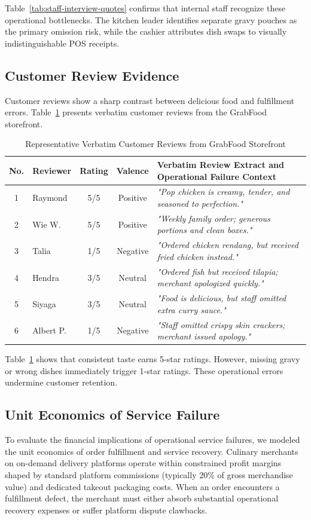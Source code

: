 \documentclass{jomas}
\begin{document}
Table~\ref{tab:staff-interview-quotes} confirms that internal staff recognize these operational bottlenecks. The kitchen leader identifies separate gravy pouches as the primary omission risk, while the cashier attributes dish swaps to visually indistinguishable POS receipts.

\subsection{Customer Review Evidence}
Customer reviews show a sharp contrast between delicious food and fulfillment errors. Table~\ref{tab:review-evidence} presents verbatim customer reviews from the GrabFood storefront.

\begin{table}[H]
\caption{Representative Verbatim Customer Reviews from GrabFood Storefront}
\label{tab:review-evidence}
\centering
\small
\setlength{\tabcolsep}{5pt}
\begin{tabularx}{\textwidth}{c l c c X}
\toprule
\textbf{No.} & \textbf{Reviewer} & \textbf{Rating} & \textbf{Valence} & \textbf{Verbatim Review Extract and Operational Failure Context} \\
\midrule
1 & Raymond & 5/5 & Positive & \textit{"Pop chicken is creamy, tender, and seasoned to perfection."} \\
2 & Wie W. & 5/5 & Positive & \textit{"Weekly family order; generous portions and clean boxes."} \\
3 & Talia & 1/5 & Negative & \textit{"Ordered chicken rendang, but received fried chicken instead."} \\
4 & Hendra & 3/5 & Neutral & \textit{"Ordered fish but received tilapia; merchant apologized quickly."} \\
5 & Siyaga & 3/5 & Neutral & \textit{"Food is delicious, but staff omitted extra curry sauce."} \\
6 & Albert P. & 1/5 & Negative & \textit{"Staff omitted crispy skin crackers; merchant issued apology."} \\
\bottomrule
\end{tabularx}
\end{table}

Table~\ref{tab:review-evidence} shows that consistent taste earns 5-star ratings. However, missing gravy or wrong dishes immediately trigger 1-star ratings. These operational errors undermine customer retention.

\subsection{Unit Economics of Service Failure}
To evaluate the financial implications of operational service failures, we modeled the unit economics of order fulfillment and service recovery. Culinary merchants on on-demand delivery platforms operate within constrained profit margins shaped by standard platform commissions (typically 20\% of gross merchandise value) and dedicated takeout packaging costs. When an order encounters a fulfillment defect, the merchant must either absorb substantial operational recovery expenses or suffer platform dispute clawbacks.
\end{document}
